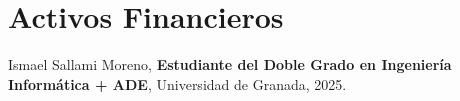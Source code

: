 \documentclass[a4paper,12pt]{book}
\begin{document}

\tableofcontents
\newpage

\chapter{Activos Financieros}





\newpage
\begin{thebibliography}{99}
Ismael Sallami Moreno, \textbf{Estudiante del Doble Grado en Ingeniería Informática + ADE}, Universidad de Granada, 2025.

\end{thebibliography}
\end{document}
